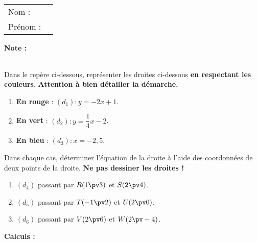 \documentclass[10pt,french]{book}
\newcommand\presentation{
\setcounter{exo}{0}
    \begin{tabular}{ll}
        Nom : \\[5pt]
        Prénom :
    \end{tabular}
\hfill
    \textbf{Note :}
        \renewcommand\arraystretch{2.3}
    \begin{tabular}{|c|}
        \hline
            \slashbox{\Huge\bfseries\phantom{10}}{\Huge\bfseries 10}\\
        \hline
    \end{tabular}
        \renewcommand\arraystretch{1.5}\par
    \vspace{1cm}
    \hrulefill
}
\begin{document}
\begin{landscape}
\clearpage


\presentation

\begin{multicols}{2}

\exo Dans le repère \OIJ ci-dessous, représenter les droites ci-dessous \textbf{en respectant les couleurs}. \textbf{Attention à bien détailler la démarche.}
\begin{enumerate}
    \item \textbf{En rouge} : $(d_1) : y = -2x + 1$.
    \item \textbf{En vert} : $(d_2) : y = \dfrac{1}{4} x - 2$.
    \item \textbf{En bleu} : $(d_3) : x = -2,5$.
\end{enumerate}\medskip

\exo Dans chaque cas, déterminer l'équation de la droite à l'aide des coordonnées de deux points de la droite. \textbf{Ne pas dessiner les droites !}
\begin{enumerate}
    \item $(d_4)$ passant par $R(1 \pv 3)$ et $S(2 \pv 4)$.
    \item $(d_5)$ passant par $T(-1 \pv 2)$ et $U(2 \pv 0)$.
    \item $(d_6)$ passant par $V(2\pv 6)$ et $W(2 \pv -4)$.
\end{enumerate}

\begin{center}
\end{center}

\columnbreak

\textbf{Calculs :}

\end{multicols}
\end{landscape}
\end{document}
